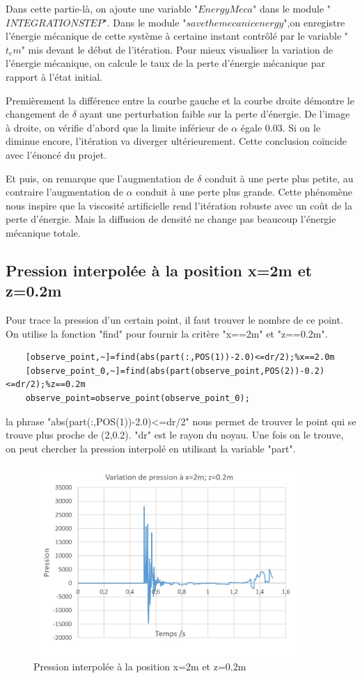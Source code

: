 \documentclass{article}
\begin{document}
Dans cette partie-là, on ajoute une variable "$EnergyMeca$" dans le module "$INTEGRATION STEP$". Dans le module "$save the mecanic energy$",on enregistre l'énergie mécanique de cette système à certaine instant contrôlé par le variable "$t_em$" mis devant le début de l'itération. Pour mieux visualiser la variation de l'énergie mécanique, on calcule le taux de la perte d'énergie mécanique par rapport à l'état initial.

Premièrement la différence entre la courbe gauche et la courbe droite démontre le changement de $\delta$ ayant une perturbation faible sur la perte d'énergie. De l'image à droite, on vérifie d'abord que la limite inférieur de $\alpha$ égale $0.03$. Si on le diminue encore, l'itération va diverger ultérieurement. Cette conclusion coïncide avec l'énoncé du projet.

Et puis, on remarque que l'augmentation de $\delta$ conduit à une perte plus petite, au contraire l'augmentation de $\alpha$ conduit à une perte plus grande. Cette phénomène nous inspire que la viscosité artificielle rend l'itération robuste avec un coût de la perte d'énergie. Mais la diffusion de densité ne change pas beaucoup l'énergie mécanique totale. 
          
\subsection{Pression interpolée à la position x=2m et z=0.2m}
Pour trace la pression d'un certain point, il faut trouver le nombre de ce point. On utilise la fonction "find" pour fournir la critère "x==2m" et "z==0.2m". 
\begin{lstlisting}
	[observe_point,~]=find(abs(part(:,POS(1))-2.0)<=dr/2);%x==2.0m
	[observe_point_0,~]=find(abs(part(observe_point,POS(2))-0.2)<=dr/2);%z==0.2m
	observe_point=observe_point(observe_point_0);
\end{lstlisting}
la phrase "abs(part(:,POS(1))-2.0)<=dr/2" nous permet de trouver le point qui se trouve plus proche de (2,0.2). "dr" est le rayon du noyau. Une fois on le trouve, on peut chercher la pression interpolé en utilisant la variable "part". 
\begin{figure}[H]
	\begin{center}
		\includegraphics[width=10cm]{img/VariationPression.jpg}
	\end{center}
	\caption{Pression interpolée à la position x=2m et z=0.2m}
\end{figure}
   
\end{document}
